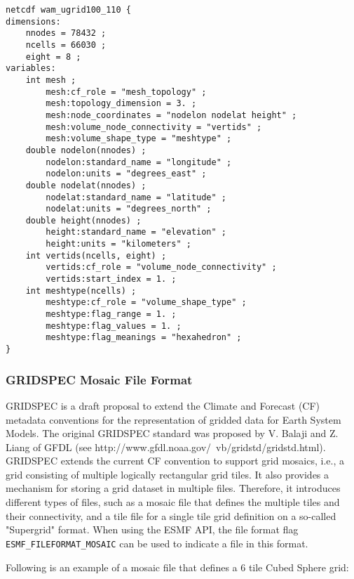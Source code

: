 \begin{verbatim}
netcdf wam_ugrid100_110 {
dimensions:
	nnodes = 78432 ;
	ncells = 66030 ;
	eight = 8 ;
variables:
	int mesh ;
		mesh:cf_role = "mesh_topology" ;
		mesh:topology_dimension = 3. ;
		mesh:node_coordinates = "nodelon nodelat height" ;
		mesh:volume_node_connectivity = "vertids" ;
		mesh:volume_shape_type = "meshtype" ;
	double nodelon(nnodes) ;
		nodelon:standard_name = "longitude" ;
		nodelon:units = "degrees_east" ;
	double nodelat(nnodes) ;
		nodelat:standard_name = "latitude" ;
		nodelat:units = "degrees_north" ;
	double height(nnodes) ;
		height:standard_name = "elevation" ;
		height:units = "kilometers" ;
	int vertids(ncells, eight) ;
		vertids:cf_role = "volume_node_connectivity" ;
		vertids:start_index = 1. ;
	int meshtype(ncells) ;
		meshtype:cf_role = "volume_shape_type" ;
		meshtype:flag_range = 1. ;
		meshtype:flag_values = 1. ;
		meshtype:flag_meanings = "hexahedron" ;
}
\end{verbatim}

\subsubsection{GRIDSPEC Mosaic File Format}\label{sec:fileformat:mosaic}

GRIDSPEC is a draft proposal to extend the Climate and Forecast (CF) metadata conventions for the representation of gridded data for Earth System Models.  The original GRIDSPEC standard was proposed by V. Balaji and Z. Liang of GFDL (see  {http://www.gfdl.noaa.gov/~vb/gridstd/gridstd.html}). GRIDSPEC extends the current CF convention to support grid  mosaics, i.e., a grid consisting of multiple logically
rectangular grid tiles. It also provides a mechanism for storing a grid dataset in multiple files.  Therefore,
it introduces different types of files, such as a mosaic file that defines the multiple tiles and their
connectivity, and a tile file for a single tile grid definition on a so-called "Supergrid" format. When using the ESMF API, the file format flag {\tt ESMF\_FILEFORMAT\_MOSAIC} can be used to indicate a file in this format.

Following is an example of a mosaic file that defines a 6 tile Cubed Sphere grid:

